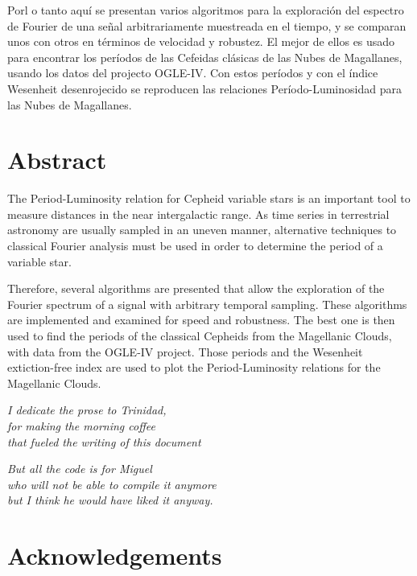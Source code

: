 \documentclass[12pt,letterpaper,oneside]{book}
\begin{document}
Porl o tanto aquí se presentan varios algoritmos para la exploración del espectro de Fourier de una señal arbitrariamente muestreada en el tiempo,
y se comparan unos con otros en términos de velocidad y robustez.
El mejor de ellos es usado para encontrar los períodos de las Cefeidas clásicas de las Nubes de Magallanes, usando los datos del projecto OGLE-IV.
Con estos períodos y con el índice Wesenheit desenrojecido se reproducen las relaciones Período-Luminosidad para las Nubes de Magallanes.

\chapter*{Abstract}

The Period-Luminosity relation for Cepheid variable stars is an important tool to measure distances in the near intergalactic range. 
As time series in terrestrial astronomy are usually sampled in an uneven manner, 
alternative techniques to classical Fourier analysis must be used in order to determine the period of a variable star.

Therefore, several algorithms are presented that allow the exploration of the Fourier spectrum of a signal with arbitrary temporal sampling.
These algorithms are implemented and examined for speed and robustness. 
The best one is then used to find the periods of the classical Cepheids from the Magellanic Clouds, with data from the OGLE-IV project. 
Those periods and the Wesenheit extiction-free index are used to plot the Period-Luminosity relations for the Magellanic Clouds.


\newpage

\begin{flushright}
	\textit{
		I dedicate the prose to Trinidad,        \\
		for making the morning coffee            \\
		that fueled the writing of this document
	}

	\vspace{5mm}

	\textit{
		But all the code is for Miguel             \\
		who will not be able to compile it anymore \\ 
		but I think he would have liked it anyway.
	}
\end{flushright}

\vspace{2mm}

\chapter*{Acknowledgements}
\end{document}
